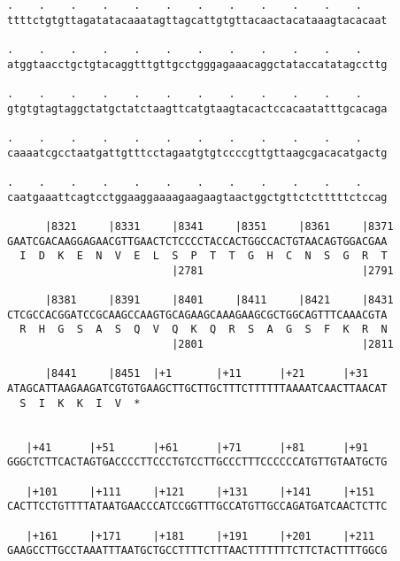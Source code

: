 \documentclass{article}
\begin{document}
\begin{Verbatim}
.    .    .    .    .    .    .    .    .    .    .    .    
ttttctgtgttagatatacaaatagttagcattgtgttacaactacataaagtacacaat
                                                            
.    .    .    .    .    .    .    .    .    .    .    .    
atggtaacctgctgtacaggtttgttgcctgggagaaacaggctataccatatagccttg
                                                            
.    .    .    .    .    .    .    .    .    .    .    .    
gtgtgtagtaggctatgctatctaagttcatgtaagtacactccacaatatttgcacaga
                                                            
.    .    .    .    .    .    .    .    .    .    .    .    
caaaatcgcctaatgattgtttcctagaatgtgtccccgttgttaagcgacacatgactg
                                                            
.    .    .    .    .    .    .    .    .    .    .    .    
caatgaaattcagtcctggaaggaaaagaagaagtaactggctgttctctttttctccag
                                                            
      |8321     |8331     |8341     |8351     |8361     |8371
GAATCGACAAGGAGAACGTTGAACTCTCCCCTACCACTGGCCACTGTAACAGTGGACGAA
  I  D  K  E  N  V  E  L  S  P  T  T  G  H  C  N  S  G  R  T
                          |2781                         |2791
  
      |8381     |8391     |8401     |8411     |8421     |8431
CTCGCCACGGATCCGCAAGCCAAGTGCAGAAGCAAAGAAGCGCTGGCAGTTTCAAACGTA
  R  H  G  S  A  S  Q  V  Q  K  Q  R  S  A  G  S  F  K  R  N
                          |2801                         |2811
  
      |8441     |8451  |+1       |+11      |+21      |+31   
ATAGCATTAAGAAGATCGTGTGAAGCTTGCTTGCTTTCTTTTTTAAAATCAACTTAACAT
  S  I  K  K  I  V  *   
                                                            
  
   |+41      |+51      |+61      |+71      |+81      |+91   
GGGCTCTTCACTAGTGACCCCTTCCCTGTCCTTGCCCTTTCCCCCCATGTTGTAATGCTG
                                                            
   |+101     |+111     |+121     |+131     |+141     |+151  
CACTTCCTGTTTTATAATGAACCCATCCGGTTTGCCATGTTGCCAGATGATCAACTCTTC
                                                            
   |+161     |+171     |+181     |+191     |+201     |+211  
GAAGCCTTGCCTAAATTTAATGCTGCCTTTTCTTTAACTTTTTTTCTTCTACTTTTGGCG
                                                            

\end{Verbatim}
\end{document}
